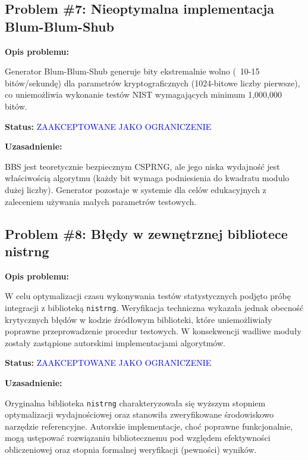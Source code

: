 \documentclass[12pt,a4paper]{article}
\begin{document}
\subsection{Problem \#7: Nieoptymalna implementacja Blum-Blum-Shub}

\begin{tcolorbox}[colback=blue!5!white,colframe=blue!75!black,title=Problem wydajnościowy - Priorytet: ŚREDNI]
\textbf{Opis problemu:}

Generator Blum-Blum-Shub generuje bity ekstremalnie wolno (~10-15 bitów/sekundę) dla parametrów kryptograficznych (1024-bitowe liczby pierwsze), co uniemożliwia wykonanie testów NIST wymagających minimum 1,000,000 bitów.

\textbf{Status:} \textcolor{blue}{ZAAKCEPTOWANE JAKO OGRANICZENIE}

\textbf{Uzasadnienie:}

BBS jest teoretycznie bezpiecznym CSPRNG, ale jego niska wydajność jest właściwością algorytmu (każdy bit wymaga podniesienia do kwadratu modulo dużej liczby). Generator pozostaje w systemie dla celów edukacyjnych z zaleceniem używania małych parametrów testowych.
\end{tcolorbox}


\subsection{Problem \#8: Błędy w zewnętrznej bibliotece nistrng}

\begin{tcolorbox}[colback=magenta!5!white,colframe=magenta!75!black,title=Problem Projektowy - Priorytet: ŚREDNI]
\textbf{Opis problemu:}

W celu optymalizacji czasu wykonywania testów statystycznych podjęto próbę integracji z biblioteką \texttt{nistrng}. Weryfikacja techniczna wykazała jednak obecność krytycznych błędów w kodzie źródłowym biblioteki, które uniemożliwiały poprawne przeprowadzenie procedur testowych. W konsekwencji wadliwe moduły zostały zastąpione autorskimi implementacjami algorytmów.

\textbf{Status:} \textcolor{blue}{ZAAKCEPTOWANE JAKO OGRANICZENIE}

\textbf{Uzasadnienie:}

Oryginalna biblioteka \texttt{nistrng} charakteryzowała się wyższym stopniem optymalizacji wydajnościowej oraz stanowiła zweryfikowane środowiskowo narzędzie referencyjne. Autorskie implementacje, choć poprawne funkcjonalnie, mogą ustępować rozwiązaniu bibliotecznemu pod względem efektywności obliczeniowej oraz stopnia formalnej weryfikacji (pewności) wyników.

\end{tcolorbox}
\end{document}
